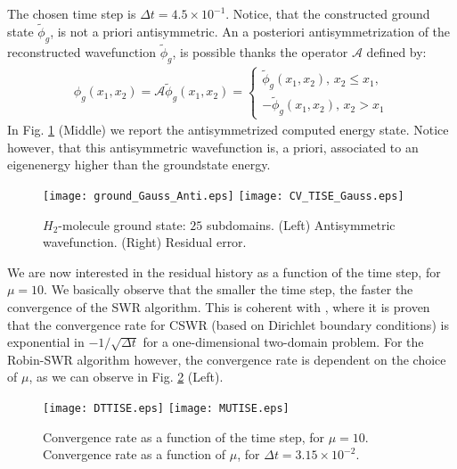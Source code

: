 The chosen time step is $\Delta t=4.5\times 10^{-1}$. Notice, that the constructed ground state $\widetilde{\phi}_g$, is not a priori antisymmetric. An a posteriori antisymmetrization of the reconstructed wavefunction $\widetilde{\phi}_g$, is possible thanks the operator $\mathcal{A}$ defined by:
\begin{eqnarray*}
\phi_g(x_1,x_2) = \mathcal{A}\widetilde{\phi}_{g}(x_1,x_2)=\left\{
\begin{array}{l}
\widetilde{\phi}_g(x_1,x_2),  \, x_2 \leq x_1,\\
-\widetilde{\phi}_g(x_1,x_2), \, x_2 > x_1
\end{array}
\right.
\end{eqnarray*}
In Fig. \ref{ground_Gauss} (Middle) we report the antisymmetrized computed energy state. Notice however, that this antisymmetric wavefunction is, a priori, associated to an eigenenergy higher than the groundstate energy.\\
\begin{figure}[!ht]
\begin{center}
\hspace*{1mm}\texttt{[image: ground\_Gauss\_Anti.eps]}
\hspace*{1mm}\texttt{[image: CV\_TISE\_Gauss.eps]}
\caption{$H_2$-molecule ground state: $25$ subdomains. (Left) Antisymmetric wavefunction. (Right) Residual error.}
\label{ground_Gauss}
\end{center}
\end{figure}
We are now interested in the residual history as a function of the time step, for $\mu=10$. We basically observe that the smaller the time step, the faster the convergence of the SWR algorithm. This is coherent with \cite{halpern3,lorin-TBS}, where it is proven that the convergence rate for CSWR (based on Dirichlet boundary conditions) is exponential in $-1/\sqrt{\Delta t}$ for a one-dimensional two-domain problem. For the Robin-SWR algorithm however, the convergence rate is dependent on the choice of $\mu$, as we can observe in Fig. \ref{DT} (Left). 
\begin{figure}[!ht]
\begin{center}
\hspace*{1mm}\texttt{[image: DTTISE.eps]}
\hspace*{1mm}\texttt{[image: MUTISE.eps]}
\caption{Convergence rate as a function of the time step, for $\mu=10$. Convergence rate as a function of $\mu$, for $\Delta t=3.15\times 10^{-2}$.}
\label{DT}
\end{center}
\end{figure}
